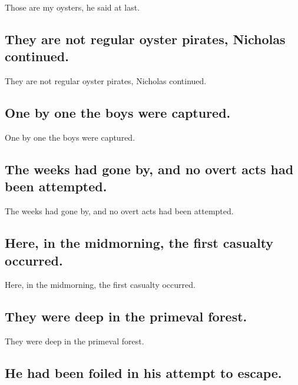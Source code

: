 \documentclass[]{article}
\begin{document}
Those are my oysters, he said at last.

\hypertarget{they-are-not-regular-oyster-pirates-nicholas-continued.}{%
\subsection{They are not regular oyster pirates, Nicholas
continued.}\label{they-are-not-regular-oyster-pirates-nicholas-continued.}}

They are not regular oyster pirates, Nicholas continued.

\hypertarget{one-by-one-the-boys-were-captured.}{%
\subsection{One by one the boys were
captured.}\label{one-by-one-the-boys-were-captured.}}

One by one the boys were captured.

\hypertarget{the-weeks-had-gone-by-and-no-overt-acts-had-been-attempted.}{%
\subsection{The weeks had gone by, and no overt acts had been
attempted.}\label{the-weeks-had-gone-by-and-no-overt-acts-had-been-attempted.}}

The weeks had gone by, and no overt acts had been attempted.

\hypertarget{here-in-the-midmorning-the-first-casualty-occurred.}{%
\subsection{Here, in the midmorning, the first casualty
occurred.}\label{here-in-the-midmorning-the-first-casualty-occurred.}}

Here, in the midmorning, the first casualty occurred.

\hypertarget{they-were-deep-in-the-primeval-forest.}{%
\subsection{They were deep in the primeval
forest.}\label{they-were-deep-in-the-primeval-forest.}}

They were deep in the primeval forest.

\hypertarget{he-had-been-foiled-in-his-attempt-to-escape.}{%
\subsection{He had been foiled in his attempt to
escape.}\label{he-had-been-foiled-in-his-attempt-to-escape.}}
\end{document}
